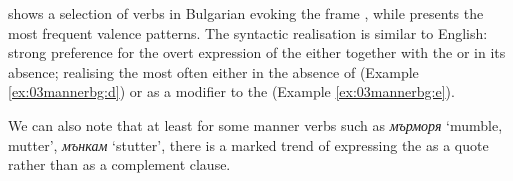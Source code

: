 \documentclass[output=paper,colorlinks,citecolor=brown]{langscibook}
\begin{document}
 shows a selection of verbs in Bulgarian evoking the frame , while
 presents the most frequent valence patterns. The syntactic realisation is similar to English: strong preference for the overt expression of the  either together with the  or in its absence; realising the  most often either in the absence of (Example \ref{ex:03mannerbg:d}) or as a modifier to the  (Example \ref{ex:03mannerbg:e}).

We can also note that at least for some manner verbs such as \textit{мърморя} `mumble, mutter’, \textit{мънкам} `stutter’, there is a marked trend of expressing the  as a quote rather than as a complement clause. 
\end{document}
